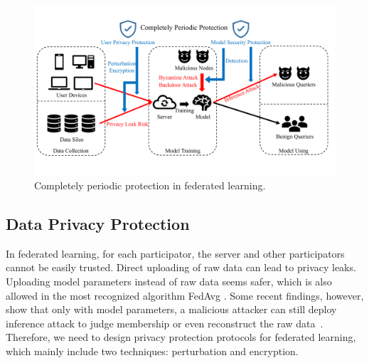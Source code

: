 \documentclass[11pt]{article}
\begin{document}
\begin{figure}
\centering
\includegraphics[scale=0.4]{submissions/yongxin/figs/protection.pdf}
\caption{Completely periodic protection in federated learning.}
\label{fig:protection}
\end{figure}

\subsection{Data Privacy Protection}
In federated learning, for each participator, the server and other participators cannot be easily trusted. Direct uploading of raw data can lead to privacy leaks.
Uploading model parameters instead of raw data seems safer, which is also allowed in the most recognized algorithm FedAvg \cite{DBLP:conf/aistats/McMahanMRHA17}.
Some recent findings, however, show that only with model parameters, a malicious attacker can still deploy inference attack to judge membership or even reconstruct the raw data~\cite{DBLP:journals/tifs/PhongAHWM18}.
Therefore, we need to design privacy protection protocols for federated learning, which mainly include two techniques: perturbation and encryption.
\end{document}
